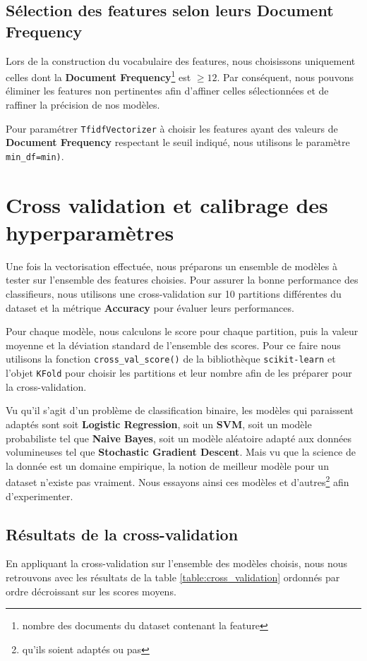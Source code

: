 \documentclass[12pt,a4paper]{report}
\theoremstyle{definition}
\begin{document}
\subsection{Sélection des features selon leurs Document Frequency}
Lors de la construction du vocabulaire des features, nous choisissons uniquement celles dont la \textbf{Document Frequency}\footnote{nombre des documents du dataset contenant la feature} est $\geq 12$. Par conséquent, nous pouvons éliminer les features non pertinentes afin d'affiner celles sélectionnées et de raffiner la précision de nos modèles.

Pour paramétrer \texttt{TfidfVectorizer} à choisir les features ayant des valeurs de \textbf{Document Frequency} respectant le seuil indiqué, nous utilisons le paramètre \texttt{min\_df=min)}.

\section{Cross validation et calibrage des hyperparamètres}
Une fois la vectorisation effectuée, nous préparons un ensemble de modèles à tester sur l'ensemble des features choisies. Pour assurer la bonne performance des classifieurs, nous utilisons une cross-validation sur 10 partitions différentes du dataset et la métrique \textbf{Accuracy} pour évaluer leurs performances.

Pour chaque modèle, nous calculons le score pour chaque partition, puis la valeur moyenne et la déviation standard de l'ensemble des scores.
Pour ce faire nous utilisons la fonction \texttt{cross\_val\_score()} de la bibliothèque \texttt{scikit-learn} et l'objet \texttt{KFold} pour choisir les partitions et leur nombre afin de les préparer pour la cross-validation.

Vu qu'il s'agit d'un problème de classification binaire, les modèles qui paraissent adaptés sont soit \textbf{Logistic Regression}, soit un \textbf{SVM}, soit un modèle probabiliste tel que \textbf{Naive Bayes}, soit un modèle aléatoire adapté aux données volumineuses tel que \textbf{Stochastic Gradient Descent}. Mais vu que la science de la donnée est un domaine empirique, la notion de meilleur modèle pour un dataset n'existe pas vraiment. Nous essayons ainsi ces modèles et d'autres\footnote{qu'ils soient adaptés ou pas} afin d'experimenter.

\subsection{Résultats de la cross-validation}
En appliquant la cross-validation sur l’ensemble des modèles choisis, nous nous retrouvons avec les résultats de la table \ref{table:cross_validation} ordonnés par ordre décroissant sur les scores moyens.
\end{document}
